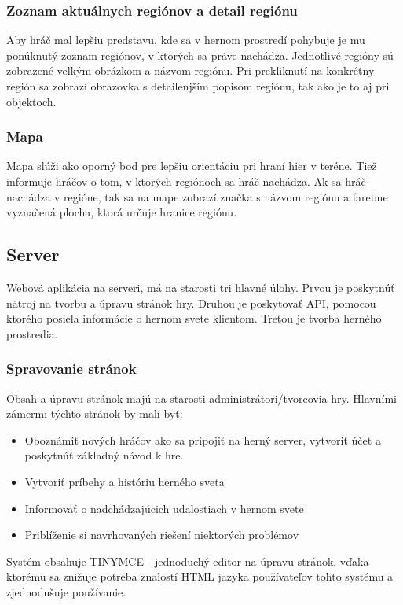 \subsubsection{Zoznam aktuálnych regiónov a detail regiónu}
Aby hráč mal lepšiu predstavu, kde sa v hernom prostredí pohybuje je mu ponúknutý zoznam regiónov, v ktorých sa práve nachádza. Jednotlivé regióny sú zobrazené velkým obrázkom a názvom regiónu. Pri prekliknutí na konkrétny región sa zobrazí obrazovka s detailenjším popisom regiónu, tak ako je to aj pri objektoch.

\subsubsection{Mapa}
Mapa slúži ako oporný bod  pre lepšiu orientáciu pri hraní hier v teréne. Tiež informuje hráčov o tom, v ktorých regiónoch sa hráč nachádza. Ak sa hráč nachádza v regióne, tak sa na mape zobrazí značka s názvom regiónu a farebne vyznačená plocha, ktorá určuje hranice regiónu.


\subsection{Server}
Webová aplikácia na serveri, má na starosti tri hlavné úlohy. Prvou je poskytnúť nátroj na tvorbu a úpravu stránok hry. Druhou je poskytovať API, pomocou ktorého posiela informácie o hernom svete klientom. Treťou je tvorba herného prostredia.\ 

\subsubsection{Spravovanie stránok}
Obsah a úpravu stránok majú na starosti administrátori/tvorcovia hry. Hlavními zámermi týchto stránok by mali byť:
 \begin{itemize}
  \item Oboznámiť nových hráčov ako sa pripojiť na herný server, vytvoriť účet a poskytnúť základný návod k hre.
  \item Vytvoriť príbehy a históriu herného sveta 
  \item Informovať o nadchádzajúcich udalostiach v hernom svete
  \item Priblíženie si navrhovaných riešení niektorých problémov
\end{itemize}
Systém obsahuje TINYMCE - jednoduchý editor na úpravu stránok, vďaka ktorému sa znižuje potreba znalostí HTML jazyka používateľov tohto systému a zjednodušuje používanie.

